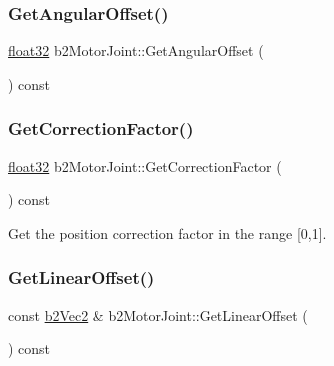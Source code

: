 \subsubsection{\texorpdfstring{GetAngularOffset()}{GetAngularOffset()}}
{\footnotesize\ttfamily \mbox{\hyperlink{b2_settings_8h_aacdc525d6f7bddb3ae95d5c311bd06a1}{float32}} b2\+Motor\+Joint\+::\+Get\+Angular\+Offset (\begin{DoxyParamCaption}{ }\end{DoxyParamCaption}) const}

\mbox{\label{classb2_motor_joint_a429f9656d9f39e6e992de59c9620d6c6}} 
\subsubsection{\texorpdfstring{GetCorrectionFactor()}{GetCorrectionFactor()}}
{\footnotesize\ttfamily \mbox{\hyperlink{b2_settings_8h_aacdc525d6f7bddb3ae95d5c311bd06a1}{float32}} b2\+Motor\+Joint\+::\+Get\+Correction\+Factor (\begin{DoxyParamCaption}{ }\end{DoxyParamCaption}) const}



Get the position correction factor in the range \mbox{[}0,1\mbox{]}. 

\mbox{\label{classb2_motor_joint_a87a61f162e202e2f3c12200e42e3b180}} 
\subsubsection{\texorpdfstring{GetLinearOffset()}{GetLinearOffset()}}
{\footnotesize\ttfamily const \mbox{\hyperlink{structb2_vec2}{b2\+Vec2}} \& b2\+Motor\+Joint\+::\+Get\+Linear\+Offset (\begin{DoxyParamCaption}{ }\end{DoxyParamCaption}) const}

\mbox{\label{classb2_motor_joint_ac7353eace38d2593a523149abe8ec2b5}} 
